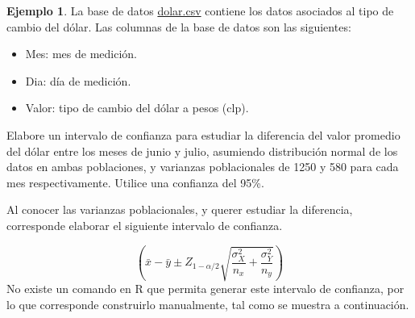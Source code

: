 \documentclass[
  11pt,
]{book}
\newenvironment{Shaded}{\begin{snugshade}}{\end{snugshade}}
\newcommand{\CommentTok}[1]{\textcolor[rgb]{0.56,0.35,0.01}{\textit{#1}}}
\newcommand{\DecValTok}[1]{\textcolor[rgb]{0.00,0.00,0.81}{#1}}
\newcommand{\FloatTok}[1]{\textcolor[rgb]{0.00,0.00,0.81}{#1}}
\newcommand{\FunctionTok}[1]{\textcolor[rgb]{0.13,0.29,0.53}{\textbf{#1}}}
\newcommand{\NormalTok}[1]{#1}
\newcommand{\OtherTok}[1]{\textcolor[rgb]{0.56,0.35,0.01}{#1}}
\newcommand{\SpecialCharTok}[1]{\textcolor[rgb]{0.81,0.36,0.00}{\textbf{#1}}}
\newcommand{\StringTok}[1]{\textcolor[rgb]{0.31,0.60,0.02}{#1}}
\providecommand{\tightlist}{%
  \setlength{\itemsep}{0pt}\setlength{\parskip}{0pt}}
\theoremstyle{definition}
\theoremstyle{definition}
\newtheorem{example}{Ejemplo}[chapter]
\theoremstyle{definition}
\theoremstyle{definition}
\theoremstyle{remark}
\begin{document}
\begin{example}
\protect\hypertarget{exm:ICdiferencianormal}{}\label{exm:ICdiferencianormal}La base de datos \href{https://raw.githubusercontent.com/Dfranzani/Bases-de-datos-para-cursos/main/2022-2/Estad\%C3\%ADstica\%201/dolar.csv}{dolar.csv} contiene los datos asociados al tipo de cambio del dólar. Las columnas de la base de datos son las siguientes:

\begin{itemize}
\tightlist
\item
  Mes: mes de medición.
\item
  Dia: día de medición.
\item
  Valor: tipo de cambio del dólar a pesos (clp).
\end{itemize}

Elabore un intervalo de confianza para estudiar la diferencia del valor promedio del dólar entre los meses de junio y julio, asumiendo distribución normal de los datos en ambas poblaciones, y varianzas poblacionales de 1250 y 580 para cada mes respectivamente. Utilice una confianza del 95\%.

Al conocer las varianzas poblacionales, y querer estudiar la diferencia, corresponde elaborar el siguiente intervalo de confianza.

\[\left(\bar{x} - \bar{y} \pm Z_{1-\alpha/2}\displaystyle\sqrt{\displaystyle\frac{\sigma^2_X}{n_x} + \displaystyle\frac{\sigma^2_Y}{n_y}}\right)\]
No existe un comando en R que permita generar este intervalo de confianza, por lo que corresponde construirlo manualmente, tal como se muestra a continuación.

\begin{Shaded}
\end{Shaded}


\end{example}
\end{document}
